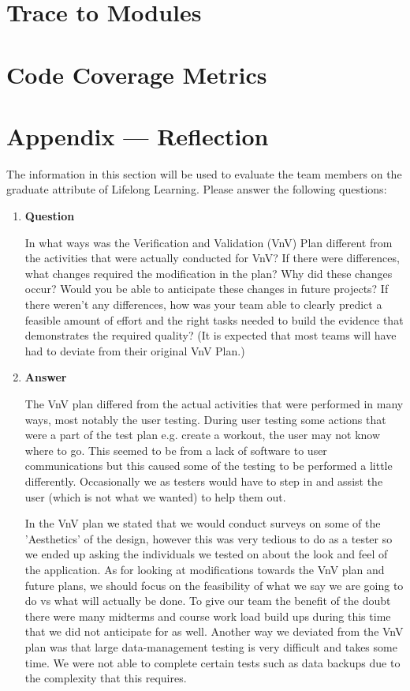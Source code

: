 \documentclass[12pt, titlepage]{article}
\begin{document}
\section{Trace to Modules}		

\section{Code Coverage Metrics}




\newpage{}
\section*{Appendix --- Reflection}

The information in this section will be used to evaluate the team members on the
graduate attribute of Lifelong Learning.  Please answer the following questions:

\begin{enumerate}
	\item \textbf{Question} 
	
	In what ways was the Verification and Validation (VnV) Plan different
	from the activities that were actually conducted for VnV?  If there were
	differences, what changes required the modification in the plan?  Why did
	these changes occur?  Would you be able to anticipate these changes in future
	projects?  If there weren't any differences, how was your team able to clearly
	predict a feasible amount of effort and the right tasks needed to build the
	evidence that demonstrates the required quality?  (It is expected that most
	teams will have had to deviate from their original VnV Plan.)
	
	\item \textbf{Answer}
	
	The VnV plan differed from the actual activities that were performed in many ways, most notably the user testing. During user testing some actions that were a part of the test plan e.g. create a workout, the user may not know where to go. This seemed to be from a lack of software to user communications but this caused some of the testing to be performed a little differently. Occasionally we as testers would have to step in and assist the user (which is not what we wanted) to help them out.
	 
	In the VnV plan we stated that we would conduct surveys on some of the 'Aesthetics' of the design, however this was very tedious to do as a tester so we ended up asking the individuals we tested on about the look and feel of the application. As for looking at modifications towards the VnV plan and future plans, we should focus on the feasibility of what we say we are going to do vs what will actually be done. To give our team the benefit of the doubt there were many midterms and course work load build ups during this time that we did not anticipate for as well. Another way we deviated from the VnV plan was that large data-management testing is very difficult and takes some time. We were not able to complete certain tests such as data backups due to the complexity that this requires. 
\end{enumerate}
\end{document}
